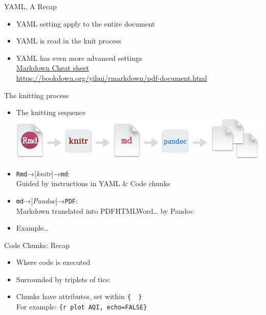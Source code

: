 \documentclass[
  ignorenonframetext,
]{beamer}
\providecommand{\tightlist}{%
  \setlength{\itemsep}{0pt}\setlength{\parskip}{0pt}}
\begin{document}
\begin{frame}{YAML, A Recap}
\protect\hypertarget{yaml-a-recap}{}
\begin{itemize}
\tightlist
\item
  YAML setting apply to the entire document
\item
  YAML is read in the knit process
\item
  YAML has even more advanced settings\\
  \href{https://raw.githubusercontent.com/rstudio/cheatsheets/main/rmarkdown.pdf}{Markdown
  Cheat sheet}\\
  \url{https://bookdown.org/yihui/rmarkdown/pdf-document.html}
\end{itemize}
\end{frame}

\begin{frame}[fragile]{The knitting process}
\protect\hypertarget{the-knitting-process}{}
\begin{itemize}
\tightlist
\item
  The knitting sequence
  \href{https://env872.github.io/assets/images/rmarkdownflow.png}{\includegraphics{img/rmarkdownflow.png}}
\item
  \texttt{Rmd}→{[}\emph{knitr}{]}→\texttt{md}:\\
  Guided by instructions in YAML \& Code chunks
\item
  \texttt{md}→{[}\emph{Pandoc}{]}→\texttt{PDF}:\\
  Markdown translated into PDF\textbar HTML\textbar Word\textbar\ldots{}
  by Pandoc
\item
  Example\ldots{}
\end{itemize}
\end{frame}

\begin{frame}[fragile]{Code Chunks: Recap}
\protect\hypertarget{code-chunks-recap}{}
\begin{itemize}
\tightlist
\item
  Where code is executed
\item
  Surrounded by triplets of tics:
  \texttt{\textasciigrave{}\textasciigrave{}\textasciigrave{}}
\item
  Chunks have attributes, set within \texttt{\{\ \ \}}\\
  For example: \texttt{\{r\ plot\ AQI,\ echo=FALSE\}}
\end{itemize}
\end{frame}
\end{document}
